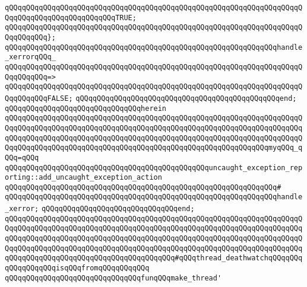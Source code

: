 \newline
\verb|qQQqqQQqqQQqqQQqqQQqqQQqqQQqqQQqqQQqqQQqqQQqqQQqqQQqqQQqqQQqqQQqqQQqqQQqqQQqqQQqqQQqqQQqqQQqqQQqTRUE;|\newline
\verb|qQQqqQQqqQQqqQQqqQQqqQQqqQQqqQQqqQQqqQQqqQQqqQQqqQQqqQQqqQQqqQQqqQQqqQQqqQQqqQQq};|\newline
\newline
\verb|qQQqqQQqqQQqqQQqqQQqqQQqqQQqqQQqqQQqqQQqqQQqqQQqqQQqqQQqqQQqqQQqhandle_xerrorqQQq_|\newline
\verb|qQQqqQQqqQQqqQQqqQQqqQQqqQQqqQQqqQQqqQQqqQQqqQQqqQQqqQQqqQQqqQQqqQQqqQQqqQQqqQQq=>|\newline
\verb|qQQqqQQqqQQqqQQqqQQqqQQqqQQqqQQqqQQqqQQqqQQqqQQqqQQqqQQqqQQqqQQqqQQqqQQqqQQqqQQqFALSE;|\newline
\verb|qQQqqQQqqQQqqQQqqQQqqQQqqQQqqQQqqQQqqQQqqQQqqQQqend;|\newline
\newline
\verb|qQQqqQQqqQQqqQQqqQQqqQQqqQQqqQQqherein|\newline
\verb|qQQqqQQqqQQqqQQqqQQqqQQqqQQqqQQqqQQqqQQqqQQqqQQqqQQqqQQqqQQqqQQqqQQqqQQqqQQqqQQqqQQqqQQqqQQqqQQqqQQqqQQqqQQqqQQqqQQqqQQqqQQqqQQqqQQqqQQqqQQqqQQqqQQqqQQqqQQqqQQqqQQqqQQqqQQqqQQqqQQqqQQqqQQqqQQqqQQqqQQqqQQqqQQqqQQqqQQqqQQqqQQqqQQqqQQqqQQqqQQqqQQqqQQqqQQqqQQqqQQqqQQqqQQqqQQqmyqQQq_qQQq=qQQq|\newline
\verb|qQQqqQQqqQQqqQQqqQQqqQQqqQQqqQQqqQQqqQQqqQQqqQQquncaught_exception_reporting::add_uncaught_exception_action|\newline
\verb|qQQqqQQqqQQqqQQqqQQqqQQqqQQqqQQqqQQqqQQqqQQqqQQqqQQqqQQqqQQqqQQq#|\newline
\verb|qQQqqQQqqQQqqQQqqQQqqQQqqQQqqQQqqQQqqQQqqQQqqQQqqQQqqQQqqQQqqQQqhandle_xerror;|\newline
\newline
\verb|qQQqqQQqqQQqqQQqqQQqqQQqqQQqqQQqend;|\newline
\newline
\verb|qQQqqQQqqQQqqQQqqQQqqQQqqQQqqQQqqQQqqQQqqQQqqQQqqQQqqQQqqQQqqQQqqQQqqQQqqQQqqQQqqQQqqQQqqQQqqQQqqQQqqQQqqQQqqQQqqQQqqQQqqQQqqQQqqQQqqQQqqQQqqQQqqQQqqQQqqQQqqQQqqQQqqQQqqQQqqQQqqQQqqQQqqQQqqQQqqQQqqQQqqQQqqQQqqQQqqQQqqQQqqQQqqQQqqQQqqQQqqQQqqQQqqQQqqQQqqQQqqQQqqQQqqQQqqQQqqQQqqQQqqQQqqQQqqQQqqQQqqQQqqQQqqQQqqQQqqQQqqQQq#qQQqthread_deathwatchqQQqqQQqqQQqqQQqqQQqisqQQqfromqQQqqQQqqQQq|\newline
\verb|qQQqqQQqqQQqqQQqqQQqqQQqqQQqqQQqfunqQQqmake_thread'|\newline
